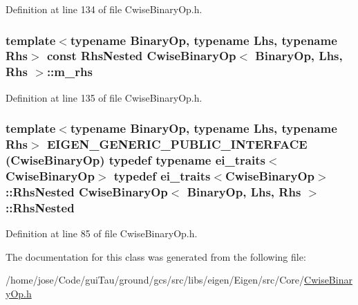 Definition at line 134 of file Cwise\-Binary\-Op.\-h.

\hypertarget{class_cwise_binary_op_ab659ca98c44f9f6c6b7dea8f481701a8}{
\subsubsection[{m\-\_\-rhs}]{\setlength{\rightskip}{0pt plus 5cm}template$<$typename Binary\-Op, typename Lhs, typename Rhs$>$ const {\bf Rhs\-Nested} {\bf Cwise\-Binary\-Op}$<$ Binary\-Op, Lhs, Rhs $>$\-::m\-\_\-rhs\hspace{0.3cm}{\ttfamily [protected]}}}\label{class_cwise_binary_op_ab659ca98c44f9f6c6b7dea8f481701a8}


Definition at line 135 of file Cwise\-Binary\-Op.\-h.

\hypertarget{class_cwise_binary_op_a02c37ce812dcda7dac764ed8c84b9934}{
\subsubsection[{Rhs\-Nested}]{\setlength{\rightskip}{0pt plus 5cm}template$<$typename Binary\-Op, typename Lhs, typename Rhs$>$ E\-I\-G\-E\-N\-\_\-\-G\-E\-N\-E\-R\-I\-C\-\_\-\-P\-U\-B\-L\-I\-C\-\_\-\-I\-N\-T\-E\-R\-F\-A\-C\-E ({\bf Cwise\-Binary\-Op}) typedef typename {\bf ei\-\_\-traits}$<${\bf Cwise\-Binary\-Op}$>$ typedef {\bf ei\-\_\-traits}$<${\bf Cwise\-Binary\-Op}$>$\-::Rhs\-Nested {\bf Cwise\-Binary\-Op}$<$ Binary\-Op, Lhs, Rhs $>$\-::Rhs\-Nested}}\label{class_cwise_binary_op_a02c37ce812dcda7dac764ed8c84b9934}


Definition at line 85 of file Cwise\-Binary\-Op.\-h.



The documentation for this class was generated from the following file\-:\begin{DoxyCompactItemize}
\item 
/home/jose/\-Code/gui\-Tau/ground/gcs/src/libs/eigen/\-Eigen/src/\-Core/\hyperlink{_cwise_binary_op_8h}{Cwise\-Binary\-Op.\-h}\end{DoxyCompactItemize}
